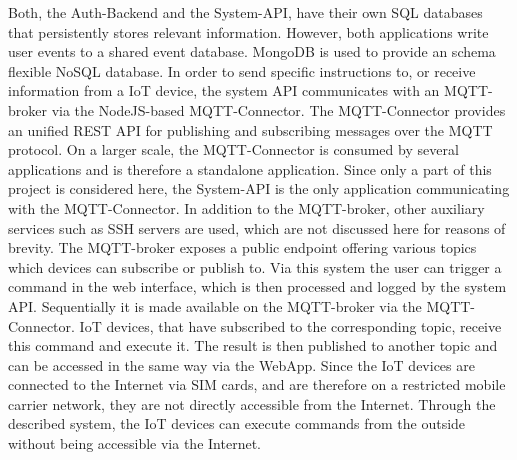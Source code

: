         Both, the Auth-Backend and the System-\ac{API}, have their own SQL databases that persistently stores relevant information. However, both applications write user events to a shared event database. MongoDB is used to provide an schema flexible NoSQL database. In order to send specific instructions to, or receive information from a \ac{IoT} device, the system \ac{API} communicates with an MQTT-broker via the NodeJS-based MQTT-Connector. The MQTT-Connector provides an unified \ac{REST} \ac{API} for publishing and subscribing messages over the MQTT protocol. On a larger scale, the MQTT-Connector is consumed by several applications and is therefore a standalone application. Since only a part of this project is considered here, the System-\ac{API} is the only application communicating with the MQTT-Connector. In addition to the MQTT-broker, other auxiliary services such as SSH servers are used, which are not discussed here for reasons of brevity. The MQTT-broker exposes a public endpoint offering various topics which devices can subscribe or publish to. Via this system the user can trigger a command in the web interface, which is then processed and logged by the system \ac{API}. Sequentially it is made available on the MQTT-broker via the MQTT-Connector. \ac{IoT} devices, that have subscribed to the corresponding topic, receive this command and execute it. The result is then published to another topic and can be accessed in the same way via the WebApp. Since the \ac{IoT} devices are connected to the Internet via SIM cards, and are therefore on a restricted mobile carrier network, they are not directly accessible from the Internet. Through the described system, the \ac{IoT} devices can execute commands from the outside without being accessible via the Internet.

